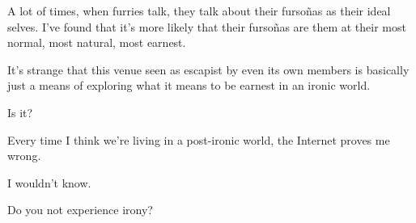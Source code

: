 \noindent A lot of times, when furries talk, they talk about their fursoñas as their ideal selves. I've found that it's more likely that their fursoñas are them at their most normal, most natural, most earnest.

It's strange that this venue seen as escapist by even its own members is basically just a means of exploring what it means to be earnest in an ironic world.

\begin{ally}
Is it?
\end{ally}
Every time I think we're living in a post-ironic world, the Internet proves me wrong.

\begin{ally}
I wouldn't know.
\end{ally}
Do you not experience irony?

